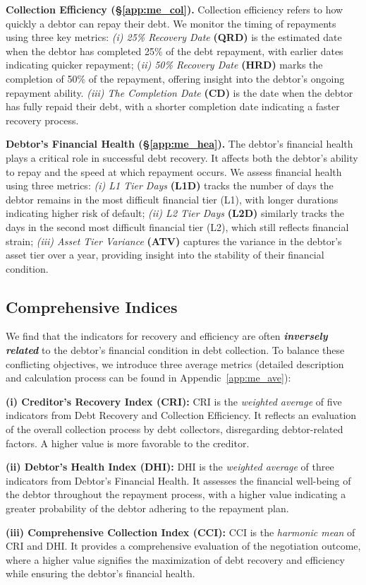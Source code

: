 \textbf{Collection Efficiency (§\ref{app:me_col}).} Collection efficiency refers to how quickly a debtor can repay their debt. We monitor the timing of repayments using three key metrics: \textit{(i) 25\% Recovery Date}\textbf{ (QRD)} is the estimated date when the debtor has completed 25\% of the debt repayment, with earlier dates indicating quicker repayment; (\textit{ii) 50\% Recovery Date} \textbf{(HRD)} marks the completion of 50\% of the repayment, offering insight into the debtor’s ongoing repayment ability. \textit{(iii) The Completion Date} \textbf{(CD)} is the date when the debtor has fully repaid their debt, with a shorter completion date indicating a faster recovery process.

\textbf{Debtor’s Financial Health (§\ref{app:me_hea}).} The debtor’s financial health plays a critical role in successful debt recovery. It affects both the debtor’s ability to repay and the speed at which repayment occurs. We assess financial health using three metrics: \textit{(i) L1 Tier Days} \textbf{(L1D)} tracks the number of days the debtor remains in the most difficult financial tier (L1), with longer durations indicating higher risk of default; \textit{(ii) L2 Tier Days} \textbf{(L2D)} similarly tracks the days in the second most difficult financial tier (L2), which still reflects financial strain; \textit{(iii) Asset Tier Variance} \textbf{(ATV)} captures the variance in the debtor’s asset tier over a year, providing insight into the stability of their financial condition. 

\subsection{Comprehensive Indices}

We find that the indicators for recovery and efficiency are often \textit{\textbf{inversely related}} to the debtor’s financial condition in debt collection. To balance these conflicting objectives, we introduce three average metrics (detailed description and calculation process can be found in Appendic~\ref{app:me_ave}):

\textbf{(i) Creditor’s Recovery Index (CRI):} CRI is the \textit{weighted average} of five indicators from Debt Recovery and Collection Efficiency. It reflects an evaluation of the overall collection process by debt collectors, disregarding debtor-related factors. A higher value is more favorable to the creditor.

\textbf{(ii) Debtor’s Health Index (DHI):} DHI is the \textit{weighted average} of three indicators from Debtor’s Financial Health. It assesses the financial well-being of the debtor throughout the repayment process, with a higher value indicating a greater probability of the debtor adhering to the repayment plan.

\textbf{(iii) Comprehensive Collection Index (CCI):} CCI is the \textit{harmonic mean} of CRI and DHI. It provides a comprehensive evaluation of the negotiation outcome, where a higher value signifies the maximization of debt recovery and efficiency while ensuring the debtor’s financial health.


